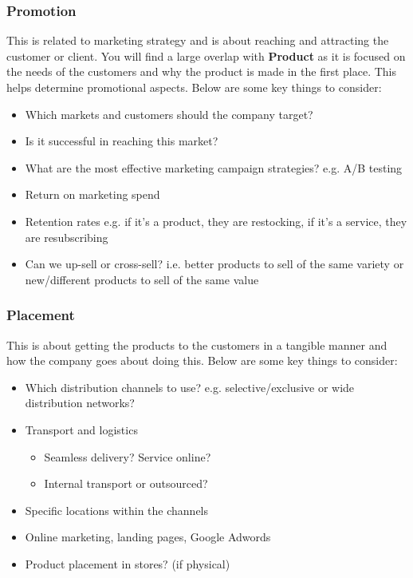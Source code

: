\documentclass[a4paper]{article}
\begin{document}
{\subsubsection{Promotion}
This is related to marketing strategy and is about reaching and attracting the customer or client. You will find a large overlap with \textbf{Product} as it is focused on the needs of the customers and why the product is made in the first place. This helps determine promotional aspects. Below are some key things to consider:

\begin{itemize}
	\item Which markets and customers should the company target?
	\item Is it successful in reaching this market?
	\item What are the most effective marketing campaign strategies? e.g. A/B testing
	\item Return on marketing spend
	\item Retention rates e.g. if it's a product, they are restocking, if it's a service, they are resubscribing
	\item Can we up-sell or cross-sell? i.e. better products to sell of the same variety or new/different products to sell of the same value
\end{itemize}

\subsubsection{Placement}
This is about getting the products to the customers in a tangible manner and how the company goes about doing this. Below are some key things to consider:

\begin{itemize}
	\item Which distribution channels to use? e.g. selective/exclusive or wide distribution networks?
	\item Transport and logistics
		\begin{itemize}
			\item Seamless delivery? Service online?
			\item Internal transport or outsourced?
		\end{itemize}
	\item Specific locations within the channels
		\item Online marketing, landing pages, Google Adwords
		\item Product placement in stores? (if physical)
\end{itemize}

}
\end{document}
